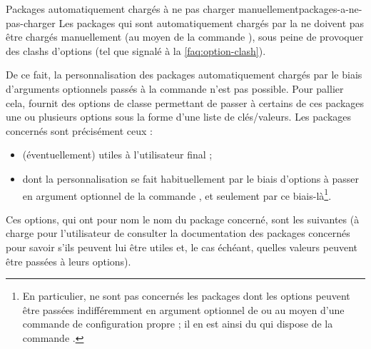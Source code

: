 \begin{dbwarning}{Packages automatiquement chargés à ne pas charger
    manuellement}{packages-a-ne-pas-charger}
  Les packages qui sont automatiquement chargés par la \yatcl{} ne doivent pas
  être chargés manuellement (au moyen de la commande
  ), sous peine de provoquer des clashs d'options
  (tel que signalé à la \vref{faq:option-clash}).
\end{dbwarning}

De ce fait, la personnalisation des packages automatiquement chargés par le
biais d'arguments optionnels passés à la commande 
n'est pas possible. Pour pallier cela, \yat{} fournit des options de classe
permettant de passer à certains de ces packages une ou plusieurs options sous
la forme d'une liste de clés/valeurs. Les packages concernés sont précisément
ceux :
\begin{itemize}
\item (éventuellement) utiles à l'utilisateur final ;
\item dont la personnalisation se fait habituellement par le biais d'options
  à passer en argument optionnel de la commande , et
  seulement par ce biais-là\footnote{En particulier, ne sont pas concernés les
    packages dont les options peuvent être passées indifféremment en argument
    optionnel de \protect{} ou au moyen d'une commande
    de configuration propre ; il en est ainsi du  qui dispose
    de la commande \protect{}.}.
\end{itemize}
Ces options, qui ont pour nom le nom du package concerné, sont les suivantes (à
charge pour l'utilisateur de consulter la documentation des packages concernés
pour savoir s'ils peuvent lui être utiles et, le cas échéant, quelles valeurs
peuvent être passées à leurs options).


